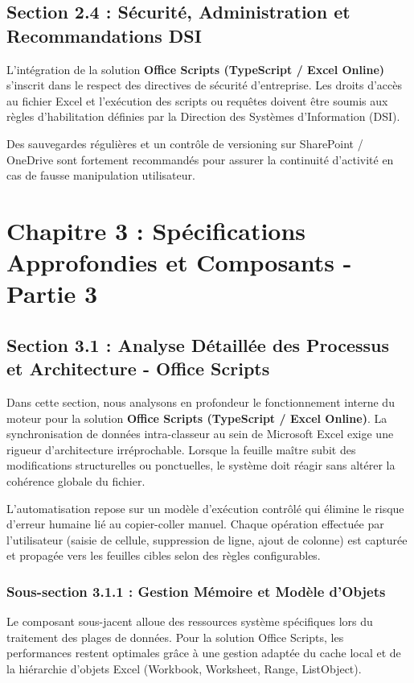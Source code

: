 \documentclass[12pt,a4paper]{report}
\begin{document}
\section{Section 2.4 : Sécurité, Administration et Recommandations DSI}
L'intégration de la solution \textbf{Office Scripts (TypeScript / Excel Online)} s'inscrit dans le respect des directives de sécurité d'entreprise. Les droits d'accès au fichier Excel et l'exécution des scripts ou requêtes doivent être soumis aux règles d'habilitation définies par la Direction des Systèmes d'Information (DSI).

Des sauvegardes régulières et un contrôle de versioning sur SharePoint / OneDrive sont fortement recommandés pour assurer la continuité d'activité en cas de fausse manipulation utilisateur.


\chapter{Chapitre 3 : Spécifications Approfondies et Composants - Partie 3}

\section{Section 3.1 : Analyse Détaillée des Processus et Architecture - Office Scripts}
Dans cette section, nous analysons en profondeur le fonctionnement interne du moteur pour la solution \textbf{Office Scripts (TypeScript / Excel Online)}. La synchronisation de données intra-classeur au sein de Microsoft Excel exige une rigueur d'architecture irréprochable. Lorsque la feuille maître subit des modifications structurelles ou ponctuelles, le système doit réagir sans altérer la cohérence globale du fichier.

L'automatisation repose sur un modèle d'exécution contrôlé qui élimine le risque d'erreur humaine lié au copier-coller manuel. Chaque opération effectuée par l'utilisateur (saisie de cellule, suppression de ligne, ajout de colonne) est capturée et propagée vers les feuilles cibles selon des règles configurables.


\subsection{Sous-section 3.1.1 : Gestion Mémoire et Modèle d'Objets}
Le composant sous-jacent alloue des ressources système spécifiques lors du traitement des plages de données. Pour la solution Office Scripts, les performances restent optimales grâce à une gestion adaptée du cache local et de la hiérarchie d'objets Excel (Workbook, Worksheet, Range, ListObject).
\end{document}

